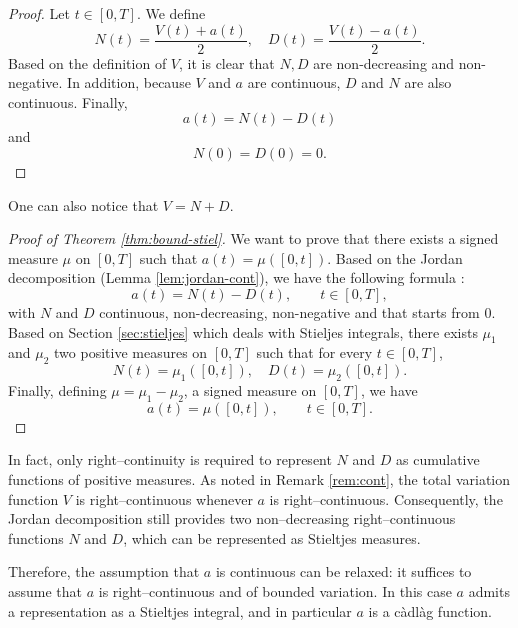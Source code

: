 \documentclass[10pt]{report}
\begin{document}
\begin{proof}
	Let $t \in [0,T]$. We define
	\[
		N(t) = \frac{V(t) + a(t)}{2}, \quad D(t) = \frac{V(t) - a(t)}{2}.
	\]
	Based on the definition of $V$, it is clear that $N,D$ are non-decreasing and non-negative.
	In addition, because $V$ and $a$ are continuous, $D$ and $N$ are also continuous. Finally,
	\[
		a(t)=N(t)-D(t)
	\]
	and
	\[
		N(0)=D(0)=0.
	\]
\end{proof}

\rem One can also notice that $V = N + D$.

\begin{proof}[Proof of Theorem \ref{thm:bound-stiel}]
	We want to prove that there exists a signed measure $\mu$ on $[0,T]$ such that $a(t) = \mu\left([0,t]\right)$.
	Based on the Jordan decomposition (Lemma \ref{lem:jordan-cont}), we have the following formula :
	\[
		a(t)=N(t)-D(t), \qquad t\in[0,T],
	\]
	with $N$ and $D$ continuous, non-decreasing, non-negative and that starts from $0$.
	Based on Section \ref{sec:stieljes} which deals with Stieljes integrals, there exists $\mu_1$ and $\mu_2$
	two positive measures on $[0,T]$ such that for every $t\in [0,T]$,
	\[
		N(t) = \mu_1([0,t]), \quad
		D(t) = \mu_2([0,t]).
	\]
	Finally, defining $\mu = \mu_1 - \mu_2$, a signed measure on $[0,T]$, we have
	\[
		a(t)=\mu([0,t]), \qquad t\in[0,T].
	\]
\end{proof}

\rem In fact, only right–continuity is required to represent $N$ and $D$ as cumulative
functions of positive measures. As noted in Remark \ref{rem:cont}, the total variation
function $V$ is right–continuous whenever $a$ is right–continuous. Consequently, the
Jordan decomposition still provides two non–decreasing right–continuous functions
$N$ and $D$, which can be represented as Stieltjes measures.

Therefore, the assumption that $a$ is continuous can be relaxed: it suffices to assume
that $a$ is right–continuous and of bounded variation. In this case $a$ admits a
representation as a Stieltjes integral, and in particular $a$ is a càdlàg function.
\end{document}
